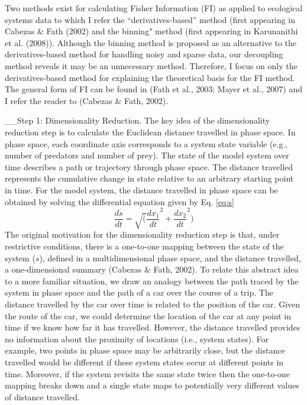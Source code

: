 \documentclass[12pt,twoside,openany]{reedthesis}
\begin{document}
Two methods exist for calculating Fisher Information (FI) as applied to ecological systems data to which I refer the ``derivatives-based'' method (first appearing in Cabezas \& Fath (2002) and the binning" method (first appearing in Karunanithi et al. (2008)). Although the binning method is proposed as an alternative to the derivatives-based method for handling noisy and sparse data, our decoupling method reveals it may be an unnecessary method. Therefore, I focus on only the derivatives-based method for explaining the theoretical basis for the FI method. The general form of FI can be found in (Fath et al., 2003; Mayer et al., 2007) and I refer the reader to (Cabezas \& Fath, 2002).

\_\_Step 1: Dimensionality Reduction. The key idea of the dimensionality reduction step is to calculate the Euclidean distance travelled in phase space. In phase space, each coordinate axis corresponds to a system state variable (e.g., number of predators and number of prey). The state of the model system over time describes a path or trajectory through phase space. The distance travelled represents the cumulative change in state relative to an arbitrary starting point in time. For the model system, the distance travelled in phase space can be obtained by solving the differential equation given by Eq. \eqref{eq:s}
\begin{equation}  
\frac{ds}{dt} = \sqrt(\frac{dx_1}{dt}^2 + \frac{dx_2}{dt}^2)
\label{eq:s}
\end{equation}
The original motivation for the dimensionality reduction step is that, under restrictive conditions, there is a one-to-one mapping between the state of the system (\(s\)), defined in a multidimensional phase space, and the distance travelled, a one-dimensional summary (Cabezas \& Fath, 2002). To relate this abstract idea to a more familiar situation, we draw an analogy between the path traced by the system in phase space and the path of a car over the course of a trip. The distance travelled by the car over time is related to the position of the car. Given the route of the car, we could determine the location of the car at any point in time if we know how far it has travelled. However, the distance travelled provides no information about the proximity of locations (i.e., system states). For example, two points in phase space may be arbitrarily close, but the distance travelled would be different if these system states occur at different points in time. Moreover, if the system revisits the same state twice then the one-to-one mapping breaks down and a single state maps to potentially very different values of distance travelled.
\end{document}
